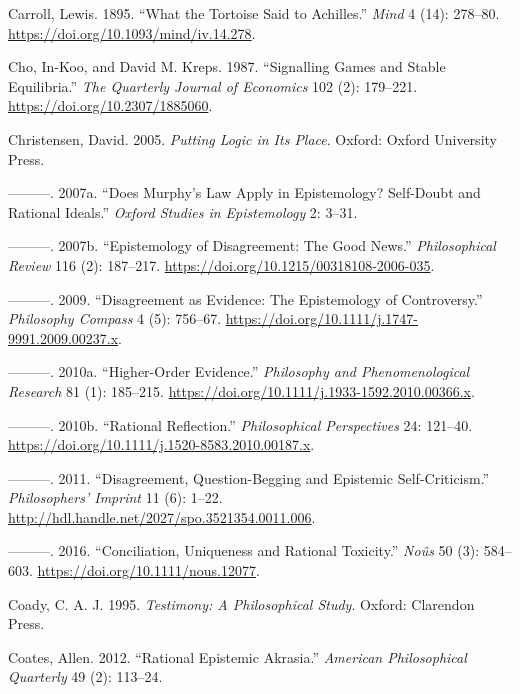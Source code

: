 \documentclass[
  10pt,
  letterpaper,
  twoside]{scrbook}
\newlength{\cslhangindent}
\newenvironment{CSLReferences}[2] %
 {\begin{list}{}{%
  \setlength{\itemindent}{0pt}
  \setlength{\leftmargin}{0pt}
  \setlength{\parsep}{0pt}
  \ifodd #1
   \setlength{\leftmargin}{\cslhangindent}
   \setlength{\itemindent}{-1\cslhangindent}
  \fi
  \setlength{\itemsep}{#2\baselineskip}}}
 {\end{list}}
\begin{document}
\begin{CSLReferences}{1}{0}
Carroll, Lewis. 1895. {``What the Tortoise Said to Achilles.''}
\emph{Mind} 4 (14): 278--80.
\url{https://doi.org/10.1093/mind/iv.14.278}.

Cho, In-Koo, and David M. Kreps. 1987. {``Signalling Games and Stable
Equilibria.''} \emph{The Quarterly Journal of Economics} 102 (2):
179--221. \url{https://doi.org/10.2307/1885060}.

Christensen, David. 2005. \emph{Putting Logic in Its Place}. Oxford:
Oxford University Press.

---------. 2007a. {``Does Murphy's Law Apply in Epistemology? Self-Doubt
and Rational Ideals.''} \emph{Oxford Studies in Epistemology} 2: 3--31.

---------. 2007b. {``Epistemology of Disagreement: The Good News.''}
\emph{Philosophical Review} 116 (2): 187--217.
\url{https://doi.org/10.1215/00318108-2006-035}.

---------. 2009. {``Disagreement as Evidence: The Epistemology of
Controversy.''} \emph{Philosophy Compass} 4 (5): 756--67.
\url{https://doi.org/10.1111/j.1747-9991.2009.00237.x}.

---------. 2010a. {``Higher-Order Evidence.''} \emph{Philosophy and
Phenomenological Research} 81 (1): 185--215.
\url{https://doi.org/10.1111/j.1933-1592.2010.00366.x}.

---------. 2010b. {``Rational Reflection.''} \emph{Philosophical
Perspectives} 24: 121--40.
\url{https://doi.org/10.1111/j.1520-8583.2010.00187.x}.

---------. 2011. {``Disagreement, Question-Begging and Epistemic
Self-Criticism.''} \emph{Philosophers' Imprint} 11 (6): 1--22.
\url{http://hdl.handle.net/2027/spo.3521354.0011.006}.

---------. 2016. {``Conciliation, Uniqueness and Rational Toxicity.''}
\emph{No{û}s} 50 (3): 584--603.
\url{https://doi.org/10.1111/nous.12077}.

Coady, C. A. J. 1995. \emph{Testimony: A Philosophical Study}. Oxford:
Clarendon Press.

Coates, Allen. 2012. {``Rational Epistemic Akrasia.''} \emph{American
Philosophical Quarterly} 49 (2): 113--24.


\end{CSLReferences}
\end{document}
